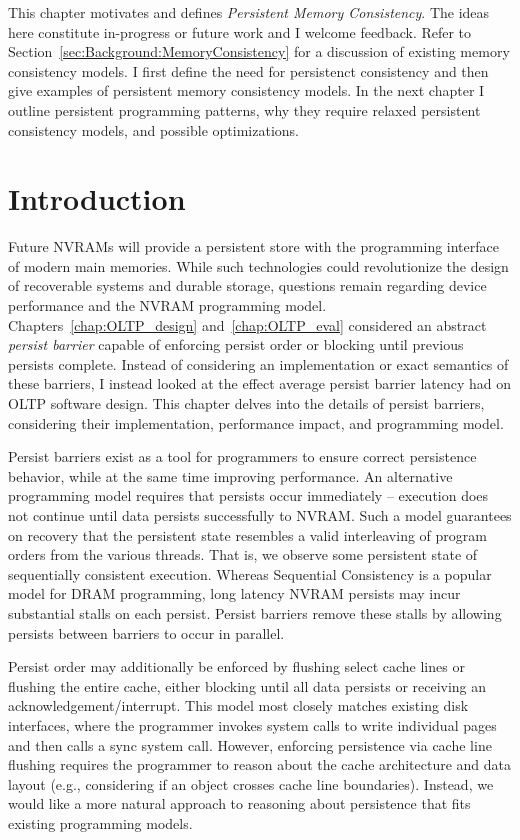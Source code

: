 This chapter motivates and defines \emph{Persistent Memory Consistency}.
The ideas here constitute in-progress or future work and I welcome feedback.
Refer to Section~\ref{sec:Background:MemoryConsistency} for a discussion of existing memory consistency models.
I first define the need for persistenct consistency and then give examples of persistent memory consistency models.
In the next chapter I outline persistent programming patterns, why they require relaxed persistent consistency models, and possible optimizations.

\section{Introduction}
\label{sec:PMC:Intro}

Future NVRAMs will provide a persistent store with the programming interface of modern main memories.
While such technologies could revolutionize the design of recoverable systems and durable storage, questions remain regarding device performance and the NVRAM programming model.
Chapters~\ref{chap:OLTP_design} and~\ref{chap:OLTP_eval} considered an abstract \emph{persist barrier} capable of enforcing persist order or blocking until previous persists complete.
Instead of considering an implementation or exact semantics of these barriers, I instead looked at the effect average persist barrier latency had on OLTP software design.
This chapter delves into the details of persist barriers, considering their implementation, performance impact, and programming model.

Persist barriers exist as a tool for programmers to ensure correct persistence behavior, while at the same time improving performance.
An alternative programming model requires that persists occur immediately -- execution does not continue until data persists successfully to NVRAM.
Such a model guarantees on recovery that the persistent state resembles a valid interleaving of program orders from the various threads.
That is, we observe some persistent state of sequentially consistent execution.
Whereas Sequential Consistency is a popular model for DRAM programming, long latency NVRAM persists may incur substantial stalls on each persist.
Persist barriers remove these stalls by allowing persists between barriers to occur in parallel.

Persist order may additionally be enforced by flushing select cache lines or flushing the entire cache, either blocking until all data persists or receiving an acknowledgement/interrupt.
This model most closely matches existing disk interfaces, where the programmer invokes system calls to write individual pages and then calls a sync system call.
However, enforcing persistence via cache line flushing requires the programmer to reason about the cache architecture and data layout (e.g., considering if an object crosses cache line boundaries).
Instead, we would like a more natural approach to reasoning about persistence that fits existing programming models.

